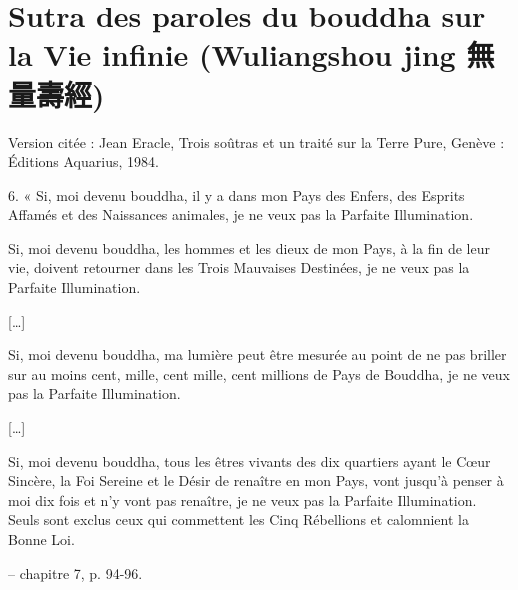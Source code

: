 \section{Sutra des paroles du bouddha sur la Vie infinie (Wuliangshou jing 無量壽經)}


Version citée : Jean Eracle, Trois soûtras et un traité sur la Terre Pure, Genève : Éditions Aquarius, 1984.

\begin{singlequote}
    6.	« Si, moi devenu bouddha, il y a dans mon Pays des Enfers, des Esprits Affamés et des Naissances animales, je ne veux pas la Parfaite Illumination.

Si, moi devenu bouddha, les hommes et les dieux de mon Pays, à la fin de leur vie, doivent retourner dans les Trois Mauvaises Destinées, je ne veux pas la Parfaite Illumination.
 
[…]

Si, moi devenu bouddha, ma lumière peut être mesurée au point de ne pas briller sur au moins cent, mille, cent mille, cent millions de Pays de Bouddha, je ne veux pas la Parfaite Illumination.

[…]

Si, moi devenu bouddha, tous les êtres vivants des dix quartiers ayant le Cœur Sincère, la Foi Sereine et le Désir de renaître en mon Pays, vont jusqu’à penser à moi dix fois et n’y vont pas renaître, je ne veux pas la Parfaite Illumination. Seuls sont exclus ceux qui commettent les Cinq Rébellions et calomnient la Bonne Loi.

-- chapitre 7, p. 94-96.
\end{singlequote}

